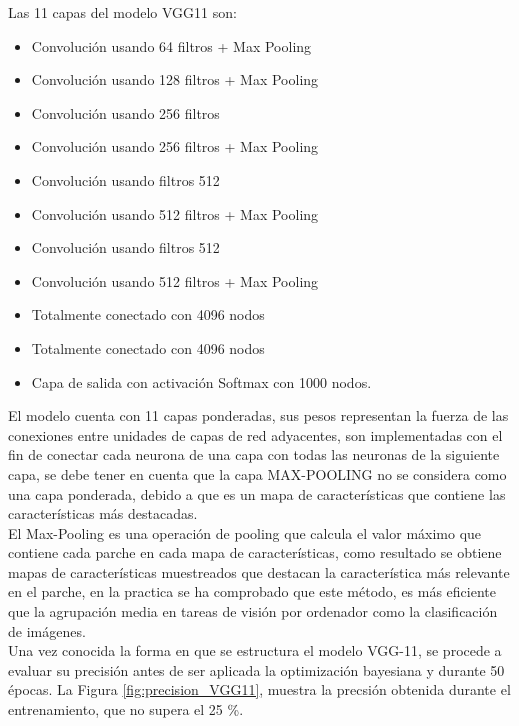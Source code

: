 			Las 11 capas del modelo VGG11 son:
				\begin{itemize}
					\item Convolución usando 64 filtros + Max Pooling
					\item Convolución usando 128 filtros + Max Pooling
					\item Convolución usando 256 filtros
					\item Convolución usando 256 filtros + Max Pooling
					\item Convolución usando filtros 512
					\item Convolución usando 512 filtros + Max Pooling
					\item Convolución usando filtros 512
					\item Convolución usando 512 filtros + Max Pooling
					\item Totalmente conectado con 4096 nodos
					\item Totalmente conectado con 4096 nodos
					\item Capa de salida con activación Softmax con 1000 nodos.
				\end{itemize}
			
			El modelo cuenta con 11 capas ponderadas, sus pesos representan la fuerza de las conexiones entre unidades de capas de red adyacentes, son implementadas con el fin de conectar cada neurona de una capa con todas las neuronas de la siguiente capa, se debe tener en cuenta que la capa MAX-POOLING no se considera como una capa ponderada, debido a que es un mapa de características que contiene las características más destacadas.\\
			
			 El Max-Pooling es una operación de pooling que calcula el valor máximo que contiene cada parche en cada mapa de características, como resultado se obtiene mapas de características muestreados que destacan la característica más relevante en el parche, en la practica se ha comprobado que este método, es más eficiente que la agrupación media en tareas de visión por ordenador como la clasificación de imágenes.\\		 
			 

			Una vez conocida la forma en que se estructura el modelo VGG-11, se procede a evaluar su precisión antes de ser aplicada la optimización bayesiana y durante 50 épocas. La Figura \ref{fig:precision_VGG11}, muestra la precsión obtenida durante el entrenamiento, que no supera el 25 \%.
			
